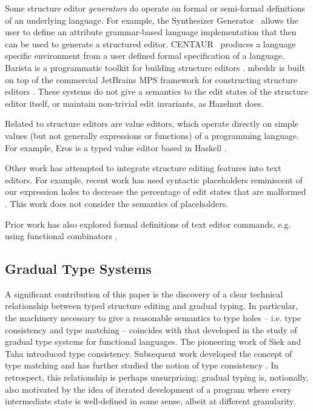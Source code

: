 \documentclass[9pt]{sigplanconf}
\begin{document}
Some structure editor \emph{generators} do operate on formal or semi-formal
definitions of an underlying language. For example, the Synthesizer
Generator~\cite{Reps:1984:SG:390010.808247} allows the user to define an
attribute grammar-based language implementation that then can be used to
generate a structured editor. CENTAUR~\cite{Borras:1988:CS:64140.65005}
produces a language specific environment from a user defined formal
specification of a language. Barista is a programmatic toolkit for building
structure editors \cite{ko_barista:_2006}. mbeddr is built on top of the
commercial JetBrains MPS framework for constructing structure
editors \cite{voelter2011language,DBLP:journals/software/VoelterWK15}. These
systems do not give a semantics to the edit states of the structure editor
itself, or maintain non-trivial edit invariants, as Hazelnut does. 

Related to structure editors are value editors, which operate directly on
simple values (but not generally expressions or functions) of a programming
language. For example, Eros is a typed value editor based in
Haskell \cite{DBLP:conf/icfp/Elliott07}.

Other work has attempted to integrate structure editing features into 
text editors. For example, recent work has used syntactic placeholders
reminiscent of our expression holes to decrease the percentage of 
edit states that are malformed \cite{Amorim:2016:PSC:2997364.2997374}. This work does not consider the semantics of placeholders. 

Prior work has also explored 
formal definitions of text editor commands, e.g. using functional 
combinators \cite{DBLP:journals/scp/Sufrin82}. 

\subsection{Gradual Type Systems}
A significant contribution of this paper is the discovery of a clear
technical relationship between typed structure editing and gradual
typing. In particular, the machinery necessary to give a reasonable
semantics to type holes -- i.e. type consistency and type matching --
coincides with that developed in the study of gradual type systems for
functional languages. The pioneering work of Siek and Taha \cite{Siek06a}
introduced type consistency. Subsequent work developed the concept of type
matching \cite{DBLP:conf/popl/RastogiCH12,DBLP:conf/popl/GarciaC15} and has further 
studied the notion of type consistency \cite{Garcia:2016:AGT:2837614.2837670}. In
retrospect, this relationship is perhaps unsurprising: gradual typing is,
notionally, also motivated by the idea of iterated development of a program
where every intermediate state is well-defined in some sense, albeit at 
different granularity.
\end{document}

